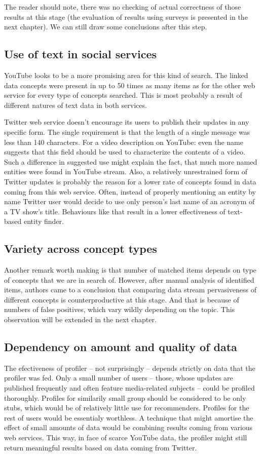 The reader should note, there was no checking of actual correctness of those results at
this stage (the evaluation of results using surveys is presented in the next chapter). We
can still draw some conclusions after this step.

\subsection{Use of text in social services}
YouTube looks to be a more promising area for this kind of search. The
linked data concepts were present in up to 50 times as many items as for the other
web service for every type of concepts searched. This is most probably a
result of different natures of text data in both services.  

Twitter web service doesn't encourage its users to publish their updates in any
specific form. The single requirement is that the length of a single message
was less than 140 characters. For a video description on YouTube: even the name
suggests that this field should be used to characterize the contents
of a video. Such a difference in suggested use might explain the fact, that
much more named entities were found in YouTube stream. Also, a relatively
unrestrained form of Twitter updates is probably the reason for a lower rate of
concepts found in data coming from this web service. Often, instead of properly
mentioning an entity by name Twitter user would decide to use only person's
last name of an acronym of a TV show's title. Behaviours like that result in a
lower effectiveness of text-based entity finder.

\subsection{Variety across concept types}
Another remark worth making is that number of matched items depends on type of
concepts that we are in search of. However, after manual analysis of identified
items, authors came to a conclusion that comparing data stream pervasiveness of
different concepts is counterproductive at this stage. And that is because of
numbers of false positives, which vary wildly depending on the topic. This
observation will be extended in the next chapter.

\subsection{Dependency on amount and quality of data}

The efectiveness of profiler -- not surprisingly -- depends strictly on data
that the profiler was fed. Only a small number of users -- those, whose updates
are published frequently and often feature media-related subjects -- could be
profiled thoroughly. Profiles for similarily small group should be considered
to be only stubs, which would be of relatively little use for recommenders.
Profiles for the rest of users would be essentialy worthless. A technique that
might amortise the effect of small amounts of data would be combining results
coming from various web services. This way, in face of scarce YouTube data, the
profiler might still return meaningful results based on data coming from
Twitter.
